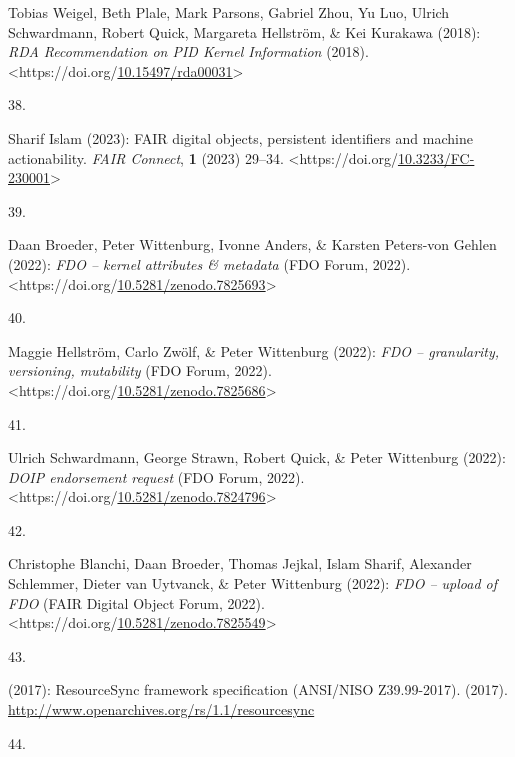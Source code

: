 \begin{thebibliography}{9}
Tobias Weigel, Beth Plale, Mark Parsons, Gabriel Zhou, Yu Luo, Ulrich
Schwardmann, Robert Quick, Margareta Hellström, \& Kei Kurakawa (2018):
\emph{{RDA Recommendation} on {PID Kernel Information}} (2018).
\textless https://doi.org/\href{https://doi.org/10.15497/rda00031}{10.15497/rda00031}\textgreater{}

\hypertarget{ref-islam_2023}{}
38.

Sharif Islam (2023): {FAIR} digital objects, persistent identifiers and
machine actionability. \emph{FAIR Connect}, \textbf{1} (2023) 29--34.
\textless https://doi.org/\href{https://doi.org/10.3233/FC-230001}{10.3233/FC-230001}\textgreater{}

\hypertarget{ref-fdo-KernelAttributes}{}
39.

Daan Broeder, Peter Wittenburg, Ivonne Anders, \& Karsten Peters-von
Gehlen (2022): \emph{{FDO} -- kernel attributes \& metadata} ({FDO
Forum}, 2022).
\textless https://doi.org/\href{https://doi.org/10.5281/zenodo.7825693}{10.5281/zenodo.7825693}\textgreater{}

\hypertarget{ref-fdo-Granularity}{}
40.

Maggie Hellström, Carlo Zwölf, \& Peter Wittenburg (2022): \emph{{FDO}
-- granularity, versioning, mutability} ({FDO Forum}, 2022).
\textless https://doi.org/\href{https://doi.org/10.5281/zenodo.7825686}{10.5281/zenodo.7825686}\textgreater{}

\hypertarget{ref-fdo-DOIPEndorsement}{}
41.

Ulrich Schwardmann, George Strawn, Robert Quick, \& Peter Wittenburg
(2022): \emph{{DOIP} endorsement request} ({FDO Forum}, 2022).
\textless https://doi.org/\href{https://doi.org/10.5281/zenodo.7824796}{10.5281/zenodo.7824796}\textgreater{}

\hypertarget{ref-fdo-FDO-Upload}{}
42.

Christophe Blanchi, Daan Broeder, Thomas Jejkal, Islam Sharif, Alexander
Schlemmer, Dieter van Uytvanck, \& Peter Wittenburg (2022): \emph{{FDO}
-- upload of {FDO}} ({FAIR Digital Object Forum}, 2022).
\textless https://doi.org/\href{https://doi.org/10.5281/zenodo.7825549}{10.5281/zenodo.7825549}\textgreater{}

\hypertarget{ref-ResourceSyncFrameworkSpecification}{}
43.

(2017): {ResourceSync} framework specification ({ANSI/NISO
Z39.99-2017}). (2017).
\url{http://www.openarchives.org/rs/1.1/resourcesync}

\hypertarget{ref-fdo-TypingFDOs}{}
44.


\end{thebibliography}
